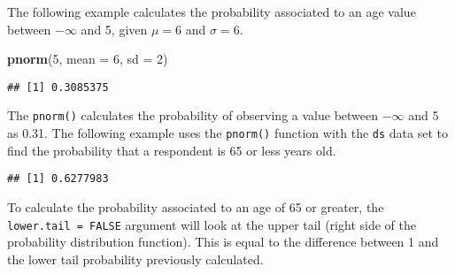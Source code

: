 \documentclass[]{article}
\newenvironment{Shaded}{\begin{snugshade}}{\end{snugshade}}
\newcommand{\KeywordTok}[1]{\textcolor[rgb]{0.13,0.29,0.53}{\textbf{#1}}}
\newcommand{\DataTypeTok}[1]{\textcolor[rgb]{0.13,0.29,0.53}{#1}}
\newcommand{\DecValTok}[1]{\textcolor[rgb]{0.00,0.00,0.81}{#1}}
\newcommand{\OtherTok}[1]{\textcolor[rgb]{0.56,0.35,0.01}{#1}}
\newcommand{\OperatorTok}[1]{\textcolor[rgb]{0.81,0.36,0.00}{\textbf{#1}}}
\newcommand{\NormalTok}[1]{#1}
\begin{document}
The following example calculates the probability associated to an age
value between \(-\infty\) and 5, given \(\mu = 6\) and \(\sigma = 6\).

\begin{Shaded}
\begin{Highlighting}[]
\KeywordTok{pnorm}\NormalTok{(}\DecValTok{5}\NormalTok{, }\DataTypeTok{mean =} \DecValTok{6}\NormalTok{, }\DataTypeTok{sd =} \DecValTok{2}\NormalTok{)}
\end{Highlighting}
\end{Shaded}

\begin{verbatim}
## [1] 0.3085375
\end{verbatim}

The \texttt{pnorm()} calculates the probability of observing a value
between \(-\infty\) and 5 as 0.31. The following example uses the
\texttt{pnorm()} function with the \texttt{ds} data set to find the
probability that a respondent is 65 or less years old.

\begin{Shaded}
\end{Shaded}

\begin{verbatim}
## [1] 0.6277983
\end{verbatim}

To calculate the probability associated to an age of 65 or greater, the
\texttt{lower.tail\ =\ FALSE} argument will look at the upper tail
(right side of the probability distribution function). This is equal to
the difference between 1 and the lower tail probability previously
calculated.

\begin{Shaded}
\end{Shaded}
\end{document}
